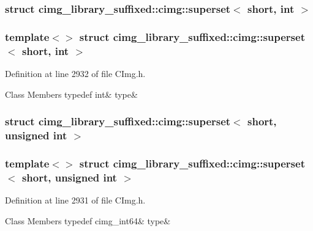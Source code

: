 \subsubsection{struct cimg\+\_\+library\+\_\+suffixed\+:\+:cimg\+:\+:superset$<$ short, int $>$}
\subsubsection*{template$<$$>$\newline
struct cimg\+\_\+library\+\_\+suffixed\+::cimg\+::superset$<$ short, int $>$}



Definition at line 2932 of file C\+Img.\+h.

\begin{DoxyFields}{Class Members}
\mbox{\label{namespacecimg__library__suffixed_1_1cimg_a5bc30aff54d759be6bdb7a864964ad61}} 
typedef int&
type&
\\
\hline

\end{DoxyFields}
\label{structcimg__library__suffixed_1_1cimg_1_1superset_3_01short_00_01unsigned_01int_01_4}
\subsubsection{struct cimg\+\_\+library\+\_\+suffixed\+:\+:cimg\+:\+:superset$<$ short, unsigned int $>$}
\subsubsection*{template$<$$>$\newline
struct cimg\+\_\+library\+\_\+suffixed\+::cimg\+::superset$<$ short, unsigned int $>$}



Definition at line 2931 of file C\+Img.\+h.

\begin{DoxyFields}{Class Members}
\mbox{\label{namespacecimg__library__suffixed_1_1cimg_ad5428836bc6d53e54215f57fc4d6fabf}} 
typedef cimg\_int64&
type&
\\
\hline

\end{DoxyFields}
\label{structcimg__library__suffixed_1_1cimg_1_1superset_3_01short_00_01unsigned_01short_01_4}
